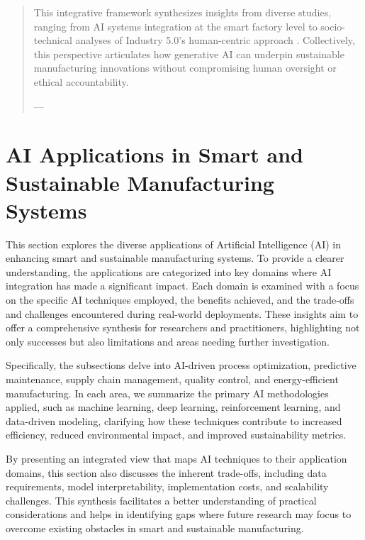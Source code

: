 \documentclass[sigconf]{acmart}
\begin{document}
\begin{abstract}
This integrative framework synthesizes insights from diverse studies, ranging from AI systems integration at the smart factory level \cite{ref11} to socio-technical analyses of Industry 5.0’s human-centric approach \cite{ref19}. Collectively, this perspective articulates how generative AI can underpin sustainable manufacturing innovations without compromising human oversight or ethical accountability.

---
\end{abstract}

\maketitle

\section{AI Applications in Smart and Sustainable Manufacturing Systems}

This section explores the diverse applications of Artificial Intelligence (AI) in enhancing smart and sustainable manufacturing systems. To provide a clearer understanding, the applications are categorized into key domains where AI integration has made a significant impact. Each domain is examined with a focus on the specific AI techniques employed, the benefits achieved, and the trade-offs and challenges encountered during real-world deployments. These insights aim to offer a comprehensive synthesis for researchers and practitioners, highlighting not only successes but also limitations and areas needing further investigation.

Specifically, the subsections delve into AI-driven process optimization, predictive maintenance, supply chain management, quality control, and energy-efficient manufacturing. In each area, we summarize the primary AI methodologies applied, such as machine learning, deep learning, reinforcement learning, and data-driven modeling, clarifying how these techniques contribute to increased efficiency, reduced environmental impact, and improved sustainability metrics.

By presenting an integrated view that maps AI techniques to their application domains, this section also discusses the inherent trade-offs, including data requirements, model interpretability, implementation costs, and scalability challenges. This synthesis facilitates a better understanding of practical considerations and helps in identifying gaps where future research may focus to overcome existing obstacles in smart and sustainable manufacturing.
\end{document}

